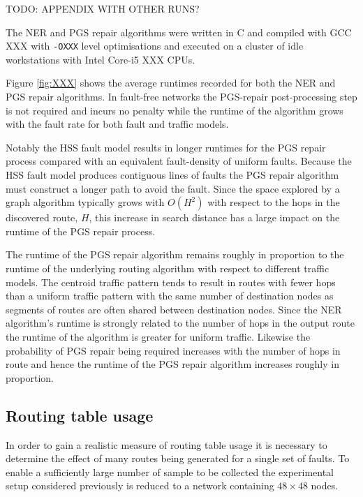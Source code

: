 			TODO: APPENDIX WITH OTHER RUNS?
			
			The NER and PGS repair algorithms were written in C and compiled with GCC
			XXX with \verb|-OXXX| level optimisations and executed on a cluster of
			idle workstations with Intel Core-i5 XXX CPUs.
			
			Figure \ref{fig:XXX} shows the average runtimes recorded for both the NER
			and PGS repair algorithms. In fault-free networks the PGS-repair
			post-processing step is not required and incurs no penalty while the
			runtime of the algorithm grows with the fault rate for both fault and
			traffic models.
			
			Notably the HSS fault model results in longer runtimes for the PGS repair
			process compared with an equivalent fault-density of uniform faults.
			Because the HSS fault model produces contiguous lines of faults the PGS
			repair algorithm must construct a longer path to avoid the fault.  Since
			the space explored by a graph algorithm typically grows with $O(H^2)$
			with respect to the hops in the discovered route, $H$, this increase in
			search distance has a large impact on the runtime of the PGS repair
			process.
			
			The runtime of the PGS repair algorithm remains roughly in proportion to
			the runtime of the underlying routing algorithm with respect to different
			traffic models. The centroid traffic pattern tends to result in routes
			with fewer hops than a uniform traffic pattern with the same number of
			destination nodes as segments of routes are often shared between
			destination nodes. Since the NER algorithm's runtime is strongly related
			to the number of hops in the output route the runtime of the algorithm is
			greater for uniform traffic. Likewise the probability of PGS repair being
			required increases with the number of hops in route and hence the runtime
			of the PGS repair algorithm increases roughly in proportion.
		
		\subsection{Routing table usage}
			
			In order to gain a realistic measure of routing table usage it is
			necessary to determine the effect of many routes being generated for a
			single set of faults. To enable a sufficiently large number of sample to
			be collected the experimental setup considered previously is reduced to a
			network containing $48\times48$ nodes.
			
